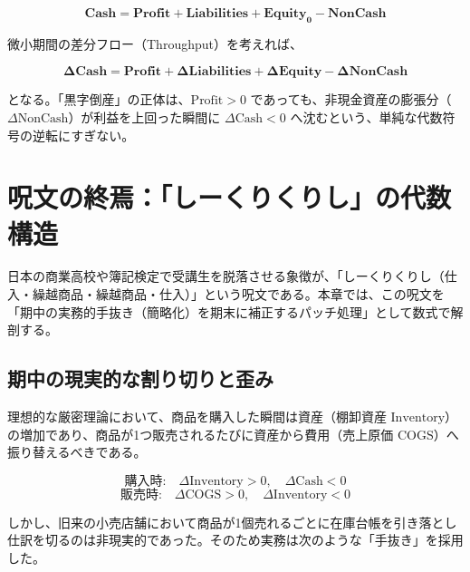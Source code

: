 \documentclass[11pt, a4paper]{report}
\begin{document}
\begin{equation}
    \mathbf{\text{Cash} = \text{Profit} + \text{Liabilities} + \text{Equity}_0 - \text{NonCash}}
\end{equation}

微小期間の差分フロー（Throughput）を考えれば、

\begin{equation}
    \mathbf{\Delta \text{Cash} = \text{Profit} + \Delta \text{Liabilities} + \Delta \text{Equity} - \Delta \text{NonCash}}
\end{equation}

となる。「黒字倒産」の正体は、$\text{Profit} > 0$ であっても、非現金資産の膨張分（$\Delta \text{NonCash}$）が利益を上回った瞬間に $\Delta \text{Cash} < 0$ へ沈むという、単純な代数符号の逆転にすぎない。

\chapter{呪文の終焉：「しーくりくりし」の代数構造}
\label{chap:cost_of_goods_sold}

日本の商業高校や簿記検定で受講生を脱落させる象徴が、「しーくりくりし（仕入・繰越商品・繰越商品・仕入）」という呪文である。本章では、この呪文を「期中の実務的手抜き（簡略化）を期末に補正するパッチ処理」として数式で解剖する。

\section{期中の現実的な割り切りと歪み}

理想的な厳密理論において、商品を購入した瞬間は資産（棚卸資産 $\text{Inventory}$）の増加であり、商品が1つ販売されるたびに資産から費用（売上原価 $\text{COGS}$）へ振り替えるべきである。

\begin{equation}
    \text{購入時:} \quad \Delta \text{Inventory} > 0, \quad \Delta \text{Cash} < 0
\end{equation}
\begin{equation}
    \text{販売時:} \quad \Delta \text{COGS} > 0, \quad \Delta \text{Inventory} < 0
\end{equation}

しかし、旧来の小売店舗において商品が1個売れるごとに在庫台帳を引き落とし仕訳を切るのは非現実的であった。そのため実務は次のような「手抜き」を採用した。
\end{document}
